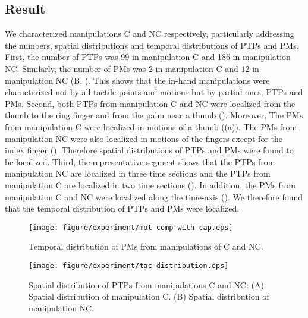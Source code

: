 \documentclass[letterpaper, 10 pt, conference]{IEEEtran}  %
\begin{document}
\subsection{Result}
We characterized manipulations C and NC respectively, particularly addressing the numbers, spatial distributions and temporal distributions of PTPs and PMs.  First, the number of PTPs was 99 in manipulation C and 186 in manipulation NC. Similarly, the number of PMs was 2 in manipulation C and 12 in manipulation NC (B, ). This shows that the in-hand manipulations were characterized not by all tactile points and motions but by partial ones, PTPs and PMs. Second, both PTPs from manipulation C and NC were localized from the thumb to the ring finger and from the palm near a thumb (). Moreover, The PMs from manipulation C were localized in motions of a thumb ((a)). The PMs from manipulation NC were also localized in motions of the fingers except for the index finger (). Therefore spatial distributions of PTPs and PMs were found to be localized. Third, the representative segment shows that the PTPs from manipulation NC are localized in three time sections and the PTPs from manipulation C are localized in two time sections (). In addition, the PMs from manipulation C and NC were localized along the time-axis (). We therefore found that the temporal distribution of PTPs and PMs were localized.

\begin{figure}[t!]
 \centering
  \texttt{[image: figure/experiment/mot-comp-with-cap.eps]} %
 \caption{Temporal distribution of PMs from manipulations of C and NC.}
 \label{fig:comp-mot}
\end{figure}


\begin{figure}[t!]
 \centering
  \texttt{[image: figure/experiment/tac-distribution.eps]}
  \caption{Spatial distribution of PTPs from manipulations C and NC: (A) Spatial distribution of manipulation C. (B) Spatial distribution of manipulation NC.}
 \label{fig:tac-dist}
\end{figure}
\end{document}
